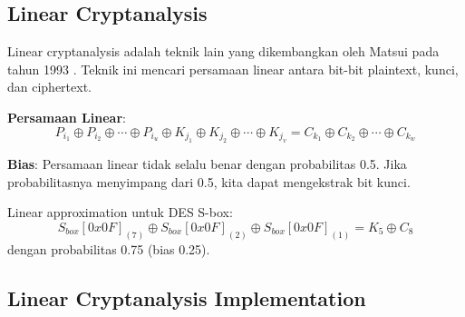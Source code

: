 \subsection{Linear Cryptanalysis}

Linear cryptanalysis adalah teknik lain yang dikembangkan oleh Matsui pada tahun 1993 \cite{matsui1993}. Teknik ini mencari persamaan linear antara bit-bit plaintext, kunci, dan ciphertext.

\textbf{Persamaan Linear}: 
\[
P_{i_1} \oplus P_{i_2} \oplus \cdots \oplus P_{i_u} \oplus K_{j_1} \oplus K_{j_2} \oplus \cdots \oplus K_{j_v} = C_{k_1} \oplus C_{k_2} \oplus \cdots \oplus C_{k_w}
\]

\textbf{Bias}: Persamaan linear tidak selalu benar dengan probabilitas 0.5. Jika probabilitasnya menyimpang dari 0.5, kita dapat mengekstrak bit kunci.

\begin{contoh}
Linear approximation untuk DES S-box:
\[
S_{box}[0x0F]_{(7)} \oplus S_{box}[0x0F]_{(2)} \oplus S_{box}[0x0F]_{(1)} = K_{5} \oplus C_{8}
\]
dengan probabilitas 0.75 (bias 0.25).
\end{contoh}

\subsection{Linear Cryptanalysis Implementation}

